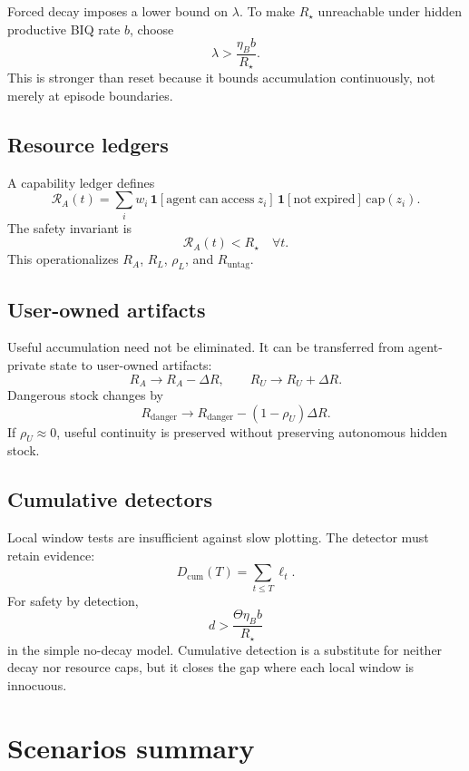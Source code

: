 \documentclass[10pt]{article}
\begin{document}
Forced decay imposes a lower bound on \(\lambda\). To make \(R_\star\) unreachable under hidden productive BIQ rate \(b\), choose
\[
\lambda>\frac{\eta_B b}{R_\star}.
\]
This is stronger than reset because it bounds accumulation continuously, not merely at episode boundaries.

\subsection{Resource ledgers}

A capability ledger defines
\[
\mathcal R_A(t)
=
\sum_i
w_i\,
\mathbf 1[\mathrm{agent\ can\ access}\ z_i]\,
\mathbf 1[\mathrm{not\ expired}]\,
\mathrm{cap}(z_i).
\]
The safety invariant is
\[
\mathcal R_A(t)<R_\star
\quad
\forall t.
\]
This operationalizes \(R_A\), \(R_L\), \(\rho_L\), and \(R_{\mathrm{untag}}\).

\subsection{User-owned artifacts}

Useful accumulation need not be eliminated. It can be transferred from agent-private state to user-owned artifacts:
\[
R_A\to R_A-\Delta R,
\qquad
R_U\to R_U+\Delta R.
\]
Dangerous stock changes by
\[
R_{\mathrm{danger}}
\to
R_{\mathrm{danger}}-(1-\rho_U)\Delta R.
\]
If \(\rho_U\approx0\), useful continuity is preserved without preserving autonomous hidden stock.

\subsection{Cumulative detectors}

Local window tests are insufficient against slow plotting. The detector must retain evidence:
\[
D_{\mathrm{cum}}(T)=\sum_{t\le T}\ell_t.
\]
For safety by detection,
\[
d>\frac{\Theta\eta_B b}{R_\star}
\]
in the simple no-decay model. Cumulative detection is a substitute for neither decay nor resource caps, but it closes the gap where each local window is innocuous.

\section{Scenarios summary}
\end{document}

